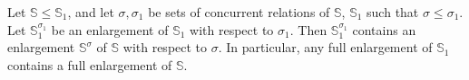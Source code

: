 Let $\mathbb{S} \leqslant \mathbb{S}_1$, and let $\sigma, \sigma_1$ be sets of concurrent relations of $\mathbb{S}$, $\mathbb{S}_1$ such that $\sigma \leqslant \sigma_1$. Let $\mathbb{S}_1^{\sigma_1}$ be an enlargement of $\mathbb{S}_1$ with respect to $\sigma_1$. Then $\mathbb{S}_1^{\sigma_1}$ contains an enlargement $\mathbb{S}^\sigma$ of $\mathbb{S}$ with respect to $\sigma$. In particular, any full enlargement of $\mathbb{S}_1$ contains a full enlargement of $\mathbb{S}$.
